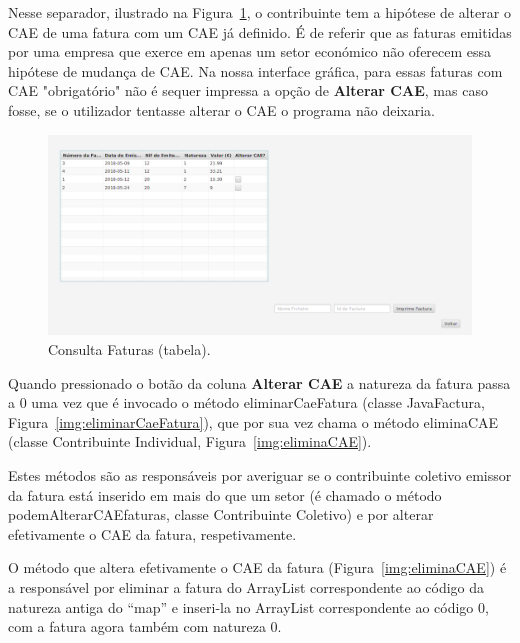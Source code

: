 \documentclass[a4paper]{article}
\begin{document}
\begin{itemize}
Nesse separador, ilustrado na Figura~\ref{img:consultafaturas}, o contribuinte tem
a hipótese de alterar o CAE de uma fatura com um CAE já definido. É de referir que
as faturas emitidas por uma empresa que exerce em apenas um setor económico
não oferecem essa hipótese de mudança de CAE. Na nossa interface gráfica, para
essas faturas com CAE "obrigatório" não é sequer
impressa a opção de \textbf{Alterar CAE}, mas caso fosse, se o utilizador tentasse
alterar o CAE o programa não deixaria.

\begin{figure}[H]
\centering
\includegraphics[scale=0.35]{imgs/consultafaturas.png}
\caption{Consulta Faturas (tabela).}
\label{img:consultafaturas}
\end{figure}


Quando pressionado o botão da coluna \textbf{Alterar CAE} a natureza da fatura passa a 0
uma vez que é invocado o método \textsf{eliminarCaeFatura} (classe \textsf{JavaFactura},
Figura~\ref{img:eliminarCaeFatura}), que
por sua vez chama o método \textsf{eliminaCAE} (classe \textsf{Contribuinte Individual},
Figura~\ref{img:eliminaCAE}).

Estes métodos são as responsáveis por averiguar se o contribuinte coletivo emissor da fatura
está inserido em mais do que um setor (é chamado o método \textsf{podemAlterarCAEfaturas},
classe \textsf{Contribuinte Coletivo}) e por alterar efetivamente o CAE da fatura, respetivamente.

O método que altera efetivamente o CAE da fatura (Figura~\ref{img:eliminaCAE})
é a responsável por eliminar a fatura
do ArrayList correspondente ao código da natureza antiga do ``map'' e inseri-la no ArrayList
correspondente ao código 0, com a fatura agora também com natureza 0.


\end{itemize}
\end{document}
